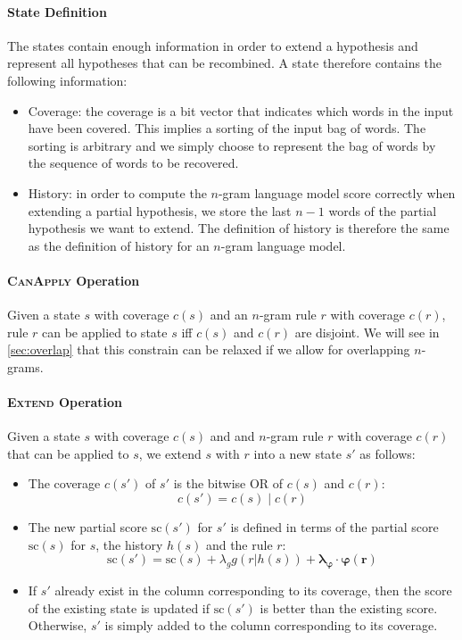 \paragraph{State Definition} The states
contain enough information
in order to extend a hypothesis and represent
all hypotheses that can be recombined. A state therefore
contains the following information:
%
\begin{itemize}
  \item Coverage: the coverage is a bit vector that indicates
    which words in the input have been covered. This implies a
    sorting of the input bag of words. The sorting is arbitrary
    and we simply choose to represent the bag of words by the
    sequence of words to be recovered.
  \item History: in order to compute the $n$-gram language model
    score correctly when extending a partial hypothesis, we
    store the last $n-1$ words of the partial hypothesis we want
    to extend. The definition of history is therefore the same
    as the definition of history for an $n$-gram language model.
\end{itemize}

\paragraph{\textsc{CanApply} Operation}

Given a state $s$ with coverage $c(s)$ and an $n$-gram rule $r$ with
coverage $c(r)$, rule $r$ can be applied to state $s$ iff $c(s)$ and
$c(r)$ are disjoint. We will see in \autoref{sec:overlap}
that this constrain can be relaxed if we allow for overlapping
$n$-grams.

\paragraph{\textsc{Extend} Operation}

Given a state $s$ with coverage $c(s)$ and and $n$-gram rule $r$
with coverage $c(r)$ that can be applied to $s$, we extend
$s$ with $r$ into a new state $s'$ as follows:
%
\begin{itemize}
  \item The coverage $c(s')$ of $s'$ is the bitwise OR
    of $c(s)$ and $c(r)$:
%
\begin{equation}
  c(s') = c(s) \mid c(r)
\end{equation}
%
  \item The new partial score $\text{sc}(s')$ for $s'$ is defined in terms
    of the partial score $\text{sc}(s)$ for $s$, the history $h(s)$ and the rule $r$:
%
\begin{equation}
  \text{sc}(s') = \text{sc}(s) + \lambda_g g(r | h(s)) + \bm{\lambda_{\varphi}} \cdot \bm{\varphi(r)}
\end{equation}
%
  \item If $s'$ already exist in the column corresponding to its coverage, then
    the score of the existing state is updated if $\text{sc}(s')$ is better than
    the existing score. Otherwise, $s'$ is simply added to the column corresponding
    to its coverage.
\end{itemize}
%

